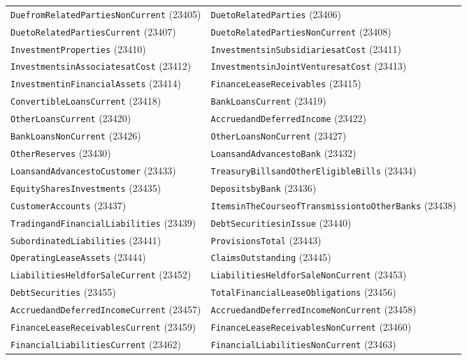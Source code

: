 \documentclass[11pt,a4paper]{report}
\begin{document}
\begin{subappendices}
{\begin{longtable}{@{}p{}p{}@{}}
\texttt{DuefromRelatedPartiesNonCurrent} (23405) & \texttt{DuetoRelatedParties} (23406) \\
\texttt{DuetoRelatedPartiesCurrent} (23407) & \texttt{DuetoRelatedPartiesNonCurrent} (23408) \\
\texttt{InvestmentProperties} (23410) & \texttt{InvestmentsinSubsidiariesatCost} (23411) \\
\texttt{InvestmentsinAssociatesatCost} (23412) & \texttt{InvestmentsinJointVenturesatCost} (23413) \\
\texttt{InvestmentinFinancialAssets} (23414) & \texttt{FinanceLeaseReceivables} (23415) \\
\texttt{ConvertibleLoansCurrent} (23418) & \texttt{BankLoansCurrent} (23419) \\
\texttt{OtherLoansCurrent} (23420) & \texttt{AccruedandDeferredIncome} (23422) \\
\texttt{BankLoansNonCurrent} (23426) & \texttt{OtherLoansNonCurrent} (23427) \\
\texttt{OtherReserves} (23430) & \texttt{LoansandAdvancestoBank} (23432) \\
\texttt{LoansandAdvancestoCustomer} (23433) & \texttt{TreasuryBillsandOtherEligibleBills} (23434) \\
\texttt{EquitySharesInvestments} (23435) & \texttt{DepositsbyBank} (23436) \\
\texttt{CustomerAccounts} (23437) & \texttt{ItemsinTheCourseofTransmissiontoOtherBanks} (23438) \\
\texttt{TradingandFinancialLiabilities} (23439) & \texttt{DebtSecuritiesinIssue} (23440) \\
\texttt{SubordinatedLiabilities} (23441) & \texttt{ProvisionsTotal} (23443) \\
\texttt{OperatingLeaseAssets} (23444) & \texttt{ClaimsOutstanding} (23445) \\
\texttt{LiabilitiesHeldforSaleCurrent} (23452) & \texttt{LiabilitiesHeldforSaleNonCurrent} (23453) \\
\texttt{DebtSecurities} (23455) & \texttt{TotalFinancialLeaseObligations} (23456) \\
\texttt{AccruedandDeferredIncomeCurrent} (23457) & \texttt{AccruedandDeferredIncomeNonCurrent} (23458) \\
\texttt{FinanceLeaseReceivablesCurrent} (23459) & \texttt{FinanceLeaseReceivablesNonCurrent} (23460) \\
\texttt{FinancialLiabilitiesCurrent} (23462) & \texttt{FinancialLiabilitiesNonCurrent} (23463) \\

\end{longtable}}
\end{subappendices}
\end{document}

